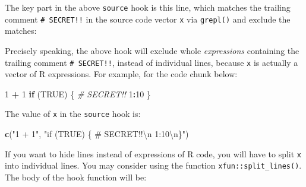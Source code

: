 \documentclass[
  11pt,
]{krantz}
\newenvironment{Shaded}{\begin{snugshade}}{\end{snugshade}}
\newcommand{\CharTok}[1]{\textcolor[rgb]{0.5,0.5,0.5}{#1}}
\newcommand{\CommentTok}[1]{\textcolor[rgb]{0.37,0.37,0.37}{\textit{#1}}}
\newcommand{\ControlFlowTok}[1]{\textcolor[rgb]{0.27,0.27,0.27}{\textbf{#1}}}
\newcommand{\DataTypeTok}[1]{\textcolor[rgb]{0.27,0.27,0.27}{#1}}
\newcommand{\DecValTok}[1]{\textcolor[rgb]{0.06,0.06,0.06}{#1}}
\newcommand{\KeywordTok}[1]{\textcolor[rgb]{0.27,0.27,0.27}{\textbf{#1}}}
\newcommand{\NormalTok}[1]{#1}
\newcommand{\OperatorTok}[1]{\textcolor[rgb]{0.43,0.43,0.43}{\textbf{#1}}}
\newcommand{\OtherTok}[1]{\textcolor[rgb]{0.37,0.37,0.37}{#1}}
\newcommand{\StringTok}[1]{\textcolor[rgb]{0.5,0.5,0.5}{#1}}
\begin{document}
The key part in the above \texttt{source} hook is this line, which matches the trailing comment \texttt{\#\ SECRET!!} in the source code vector \texttt{x} via \texttt{grepl()} and exclude the matches:

\begin{Shaded}
\end{Shaded}

Precisely speaking, the above hook will exclude whole \emph{expressions} containing the trailing comment \texttt{\#\ SECRET!!}, instead of individual lines, because \texttt{x} is actually a vector of R expressions. For example, for the code chunk below:

\begin{Shaded}
\begin{Highlighting}[]
\DecValTok{1} \OperatorTok{+}\StringTok{ }\DecValTok{1}
\ControlFlowTok{if}\NormalTok{ (}\OtherTok{TRUE}\NormalTok{) \{}
  \CommentTok{# SECRET!!}
  \DecValTok{1}\OperatorTok{:}\DecValTok{10}
\NormalTok{\}}
\end{Highlighting}
\end{Shaded}

The value of \texttt{x} in the \texttt{source} hook is:

\begin{Shaded}
\begin{Highlighting}[]
\KeywordTok{c}\NormalTok{(}\StringTok{"1 + 1"}\NormalTok{, }\StringTok{"if (TRUE) \{ # SECRET!!}\CharTok{\textbackslash{}n}\StringTok{  1:10}\CharTok{\textbackslash{}n}\StringTok{\}"}\NormalTok{)}
\end{Highlighting}
\end{Shaded}

If you want to hide lines instead of expressions of R code, you will have to split \texttt{x} into individual lines. You may consider using the function \texttt{xfun::split\_lines()}. The body of the hook function will be:

\begin{Shaded}
\end{Shaded}
\end{document}
